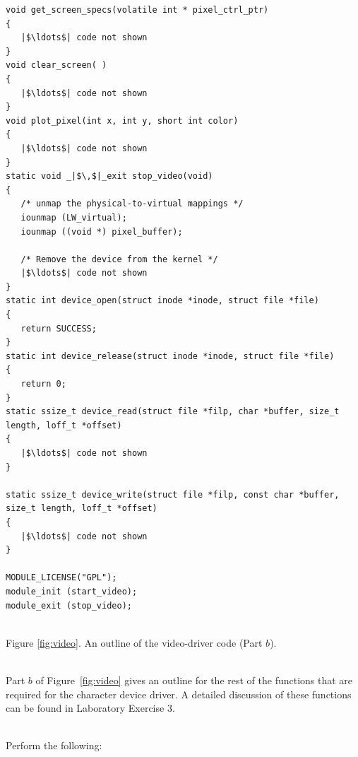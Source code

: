 \documentclass[epsfig,10pt,fullpage]{article}
\begin{document}
\begin{center}
\begin{minipage}[t]{12.5 cm}
\begin{lstlisting}[name=dots]
void get_screen_specs(volatile int * pixel_ctrl_ptr)
{
   |$\ldots$| code not shown
}
void clear_screen( )
{
   |$\ldots$| code not shown
}
void plot_pixel(int x, int y, short int color)
{
   |$\ldots$| code not shown
}
static void _|$\,$|_exit stop_video(void)
{
   /* unmap the physical-to-virtual mappings */
   iounmap (LW_virtual);
   iounmap ((void *) pixel_buffer);

   /* Remove the device from the kernel */
   |$\ldots$| code not shown
}
static int device_open(struct inode *inode, struct file *file)
{
   return SUCCESS;
}
static int device_release(struct inode *inode, struct file *file)
{
   return 0;
}
static ssize_t device_read(struct file *filp, char *buffer, size_t length, loff_t *offset)
{
   |$\ldots$| code not shown
}

static ssize_t device_write(struct file *filp, const char *buffer, size_t length, loff_t *offset)
{
   |$\ldots$| code not shown
}

MODULE_LICENSE("GPL");
module_init (start_video);
module_exit (stop_video);
\end{lstlisting}
~\\
Figure \ref{fig:video}. An outline of the video-driver code (Part $b$).
\end{minipage}
\end{center}

~\\
\noindent
Part $b$ of Figure~\ref{fig:video} gives an outline for the rest of the functions that are
required for the character device driver. A detailed discussion of these functions can be
found in Laboratory Exercise 3.

~\\
\noindent
Perform the following:
\end{document}
